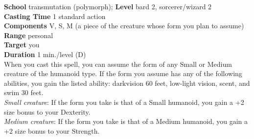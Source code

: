 \textbf{School }transmutation (polymorph); \textbf{Level }bard 2, sorcerer/wizard 2\\
\textbf{Casting Time }1 standard action\\
\textbf{Components }V, S, M (a piece of the creature whose form you plan to assume)\\
\textbf{Range }personal\\
\textbf{Target }you\\
\textbf{Duration }1 min./level (D)\\
When you cast this spell, you can assume the form of any Small or Medium creature of the humanoid type. If the form you assume has any of the following abilities, you gain the listed ability: darkvision 60 feet, low-light vision, scent, and swim 30 feet.\\
\textit{Small creature}: If the form you take is that of a Small humanoid, you gain a +2 size bonus to your Dexterity.\\
\textit{Medium creature}: If the form you take is that of a Medium humanoid, you gain a +2 size bonus to your Strength.\\
